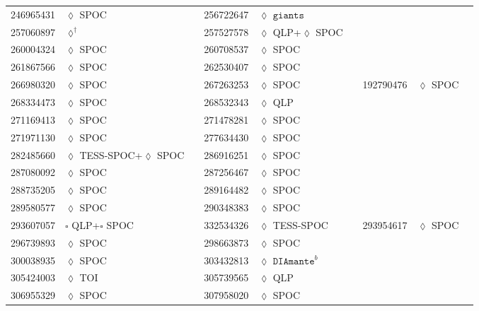 \begin{longtable}{llrllr}
246965431 & $\lozenge$ SPOC & \cite{TIC_348755728} & 256722647 & $\lozenge$ $\texttt{giants}$ & \cite{TIC_348835438} \\
257060897 & $\lozenge^\dagger$ & \cite{TIC_257060897} & 257527578 & $\lozenge$ QLP+$\lozenge$ SPOC & \cite{TIC_124029677} \\
260004324 & $\lozenge$ SPOC & \cite{TIC_103633434} & 260708537 & $\lozenge$ SPOC & \cite{TIC_260708537} \\
261867566 & $\lozenge$ SPOC & \cite{TIC_261867566} & 262530407 & $\lozenge$ SPOC & \cite{TIC_262530407} \\
266980320 & $\lozenge$ SPOC & \cite{TIC_70513361} & 267263253 & $\lozenge$ SPOC & \cite{TIC_267263253} & 192790476 & $\lozenge$ SPOC & \cite{TIC_428699140} \\
268334473 & $\lozenge$ SPOC & \cite{TIC_232540264} & 268532343 & $\lozenge$ QLP & \cite{TIC_268532343} \\
271169413 & $\lozenge$ SPOC & \cite{TIC_159418353} & 271478281 & $\lozenge$ SPOC & \cite{TIC_428699140} \\
271971130 & $\lozenge$ SPOC & \cite{TIC_271971130} & 277634430 & $\lozenge$ SPOC & \cite{TIC_159418353} \\
282485660 & $\lozenge$ TESS-SPOC+$\lozenge$ SPOC & \cite{TIC_282485660} & 286916251 & $\lozenge$ SPOC & \cite{TIC_232540264} \\
287080092 & $\lozenge$ SPOC & \cite{TIC_232540264} & 287256467 & $\lozenge$ SPOC & \cite{TIC_287256467} \\
288735205 & $\lozenge$ SPOC & \cite{TIC_288735205} & 289164482 & $\lozenge$ SPOC & \cite{TIC_348755728} \\
289580577 & $\lozenge$ SPOC & \cite{TIC_232540264} & 290348383 & $\lozenge$ SPOC & \cite{TIC_290348383} \\
293607057 & $\square$ QLP+$\square$ SPOC & \cite{TIC_293607057} & 332534326 & $\lozenge$ TESS-SPOC & \cite{TIC_332534326} & 293954617 & $\lozenge$ SPOC & \cite{TIC_293954617} \\
296739893 & $\lozenge$ SPOC & \cite{TIC_296739893} & 298663873 & $\lozenge$ SPOC & \cite{TIC_298663873} \\
300038935 & $\lozenge$ SPOC & \cite{TIC_300038935} & 303432813 & $\lozenge$ $\texttt{DIAmante}^b$ & \cite{TIC_303432813} \\
305424003 & $\lozenge$ TOI & \cite{TIC_154872375} & 305739565 & $\lozenge$ QLP & \cite{TIC_305739565} \\
306955329 & $\lozenge$ SPOC & \cite{TIC_232540264} & 307958020 & $\lozenge$ SPOC & \cite{TIC_307958020} \\

\end{longtable}
